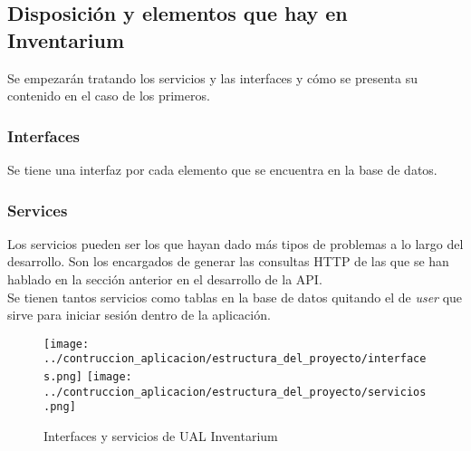 \subsection{Disposición y elementos que hay en Inventarium}
Se empezarán tratando los servicios y las interfaces y cómo se presenta su contenido en el caso de los primeros.

\subsubsection{Interfaces}
Se tiene una interfaz por cada elemento que se encuentra en la base de datos.

\subsubsection{Services}
Los servicios pueden ser los que hayan dado más tipos de problemas a lo largo del desarrollo. Son los encargados de generar las consultas HTTP de las que se han hablado en la sección anterior en el desarrollo de la API.
\\Se tienen tantos servicios como tablas en la base de datos quitando el de \textit{user} que sirve para iniciar sesión dentro de la aplicación.

\begin{figure}[h]
    \centering
    \texttt{[image: ../contruccion\_aplicacion/estructura\_del\_proyecto/interfaces.png]}
    \texttt{[image: ../contruccion\_aplicacion/estructura\_del\_proyecto/servicios.png]}
    \caption{Interfaces y servicios de UAL Inventarium}
\end{figure}

